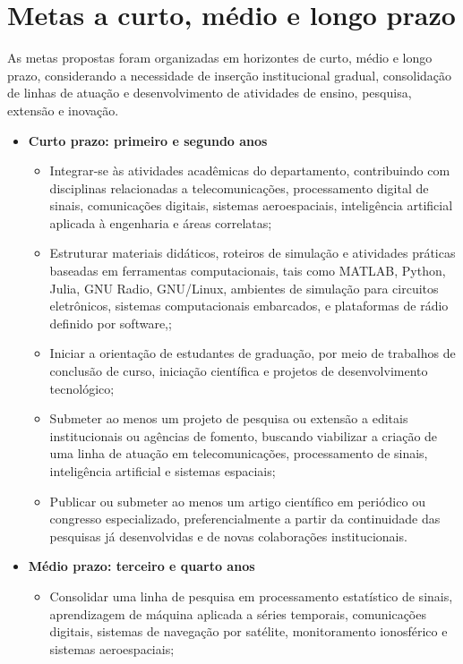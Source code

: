\documentclass{article}
\begin{document}
\section{Metas a curto, médio e longo prazo}

As metas propostas foram organizadas em horizontes de curto, médio e longo
prazo, considerando a necessidade de inserção institucional gradual,
consolidação de linhas de atuação e desenvolvimento de atividades de ensino,
pesquisa, extensão e inovação.

\begin{itemize}
  \item \textbf{Curto prazo: primeiro e segundo anos}
  \begin{itemize}
    \item Integrar-se às atividades acadêmicas do departamento, contribuindo
    com disciplinas relacionadas a telecomunicações, processamento digital de
    sinais, comunicações digitais, sistemas aeroespaciais, inteligência
    artificial aplicada à engenharia e áreas correlatas;

    \item Estruturar materiais didáticos, roteiros de simulação e atividades
    práticas baseadas em ferramentas computacionais, tais como MATLAB, Python, Julia, GNU Radio, GNU/Linux,
    ambientes de simulação para circuitos eletrônicos, sistemas computacionais embarcados, e plataformas de rádio definido por software,;

    \item Iniciar a orientação de estudantes de graduação, por meio de trabalhos
    de conclusão de curso, iniciação científica e projetos de desenvolvimento
    tecnológico;

    \item Submeter ao menos um projeto de pesquisa ou extensão a editais
    institucionais ou agências de fomento, buscando viabilizar a criação de uma
    linha de atuação em telecomunicações, processamento de sinais, inteligência
    artificial e sistemas espaciais;

    \item Publicar ou submeter ao menos um artigo científico em periódico ou
    congresso especializado, preferencialmente a partir da continuidade das
    pesquisas já desenvolvidas e de novas colaborações institucionais.
  \end{itemize}

  \item \textbf{Médio prazo: terceiro e quarto anos}
  \begin{itemize}
    \item Consolidar uma linha de pesquisa em processamento estatístico de
    sinais, aprendizagem de máquina aplicada a séries temporais, comunicações
    digitais, sistemas de navegação por satélite, monitoramento ionosférico e
    sistemas aeroespaciais;


\end{itemize}
\end{itemize}
\end{document}
